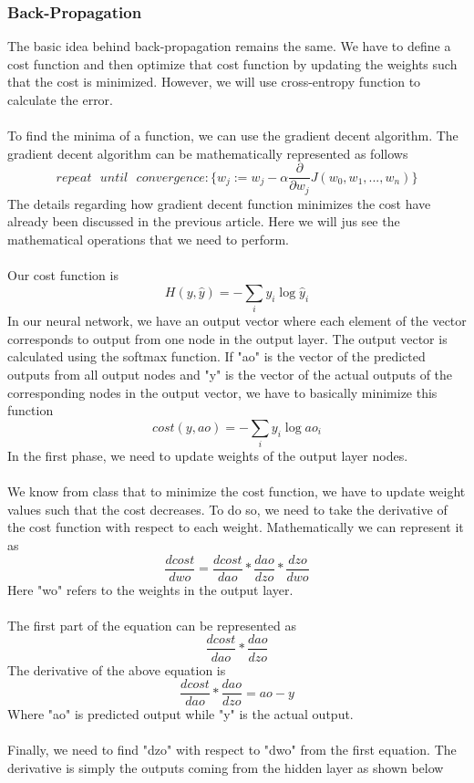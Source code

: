 \documentclass[11pt]{article}
\theoremstyle{definition}
\begin{document}
\subsubsection{Back-Propagation}
The basic idea behind back-propagation remains the same. We have to define a cost function and then optimize that cost function by updating the weights such that the cost is minimized. However, we will use cross-entropy function to calculate the error.\\\\
To find the minima of a function, we can use the gradient decent algorithm. The gradient decent algorithm can be mathematically represented as follows
$$
repeat\textrm{ }until\textrm{ }convergence:\{w_j:=w_j-\alpha \frac{\partial}{\partial w_j}J(w_0,w_1,...,w_n)\}
$$
The details regarding how gradient decent function minimizes the cost have already been discussed in the previous article. Here we will jus see the mathematical operations that we need to perform.\\\\
Our cost function is
$$
H(y,\hat{y})=-\sum_iy_i\log\hat{y}_i
$$
In our neural network, we have an output vector where each element of the vector corresponds to output from one node in the output layer. The output vector is calculated using the softmax function. If "ao" is the vector of the predicted outputs from all output nodes and "y" is the vector of the actual outputs of the corresponding nodes in the output vector, we have to basically minimize this function
$$
cost(y,ao)=-\sum_iy_i\log ao_i
$$
In the first phase, we need to update weights  of the output layer nodes.\\\\
We know from class that to minimize the cost function, we have to update weight values such that the cost decreases. To do so, we need to take the derivative of the cost function with respect to each weight. Mathematically we can represent it as
$$
\frac{dcost}{dwo}=\frac{dcost}{dao}*\frac{dao}{dzo}*\frac{dzo}{dwo}
$$
Here "wo" refers to the weights in the output layer.\\\\
The first part of the equation can be represented as
$$
\frac{dcost}{dao}*\frac{dao}{dzo}
$$
The derivative of the above equation is
$$
\frac{dcost}{dao}*\frac{dao}{dzo}=ao-y
$$
Where "ao" is predicted output while "y" is the actual output.\\\\
Finally, we need to find "dzo" with respect to "dwo" from the first equation. The derivative is simply the outputs coming from the hidden layer as shown below
\end{document}
